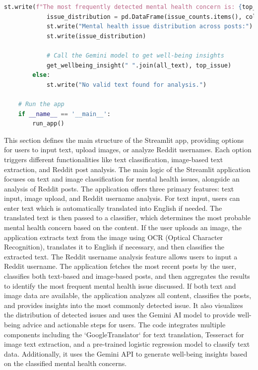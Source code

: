         \begin{tcolorbox}[colback=gray!5!white, colframe=gray!80!black, boxrule=0.5pt, title=Main Streamlit Application Logic]
            \begin{lstlisting}[language=Python]
            st.write(f"The most frequently detected mental health concern is: {top_issue} appearing in {top_percentage:.2f}% of analyzed text.")
            issue_distribution = pd.DataFrame(issue_counts.items(), columns=['Mental Health Issue', 'Count'])
            st.write("Mental health issue distribution across posts:")
            st.write(issue_distribution)

            # Call the Gemini model to get well-being insights
            get_wellbeing_insight(" ".join(all_text), top_issue)
        else:
            st.write("No valid text found for analysis.")
    
    # Run the app
    if __name__ == '__main__':
        run_app()
    \end{lstlisting}
    \end{tcolorbox}
                
\noindent
This section defines the main structure of the Streamlit app, providing options for users to input text, upload images, or analyze Reddit usernames. Each option triggers different functionalities like text classification, image-based text extraction, and Reddit post analysis.    
\newline
\newline
\noindent
The main logic of the Streamlit application focuses on text and image classification for mental health issues, alongside an analysis of Reddit posts. The application offers three primary features: text input, image upload, and Reddit username analysis. For text input, users can enter text which is automatically translated into English if needed. The translated text is then passed to a classifier, which determines the most probable mental health concern based on the content. If the user uploads an image, the application extracts text from the image using OCR (Optical Character Recognition), translates it to English if necessary, and then classifies the extracted text. The Reddit username analysis feature allows users to input a Reddit username. The application fetches the most recent posts by the user, classifies both text-based and image-based posts, and then aggregates the results to identify the most frequent mental health issue discussed. If both text and image data are available, the application analyzes all content, classifies the posts, and provides insights into the most commonly detected issue. It also visualizes the distribution of detected issues and uses the Gemini AI model to provide well-being advice and actionable steps for users. The code integrates multiple components including the `GoogleTranslator` for text translation, Tesseract for image text extraction, and a pre-trained logistic regression model to classify text data. Additionally, it uses the Gemini API to generate well-being insights based on the classified mental health concerns.

